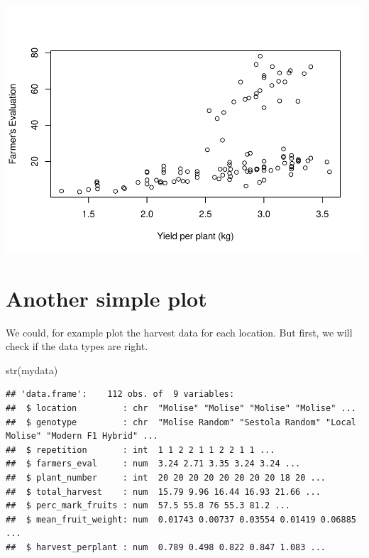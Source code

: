 \documentclass[
]{book}
\newenvironment{Shaded}{\begin{snugshade}}{\end{snugshade}}
\newcommand{\AttributeTok}[1]{\textcolor[rgb]{0.77,0.63,0.00}{#1}}
\newcommand{\CommentTok}[1]{\textcolor[rgb]{0.56,0.35,0.01}{\textit{#1}}}
\newcommand{\FunctionTok}[1]{\textcolor[rgb]{0.00,0.00,0.00}{#1}}
\newcommand{\NormalTok}[1]{#1}
\newcommand{\SpecialCharTok}[1]{\textcolor[rgb]{0.00,0.00,0.00}{#1}}
\newcommand{\StringTok}[1]{\textcolor[rgb]{0.31,0.60,0.02}{#1}}
\begin{document}
\begin{Shaded}
\end{Shaded}

\includegraphics{PPB-Toolkit_files/figure-latex/unnamed-chunk-33-1.pdf}

\hypertarget{another-simple-plot}{%
\section{Another simple plot}\label{another-simple-plot}}

We could, for example plot the harvest data for each location. But first, we will check if the data types are right.

\begin{Shaded}
\begin{Highlighting}[]
\FunctionTok{str}\NormalTok{(mydata)}
\end{Highlighting}
\end{Shaded}

\begin{verbatim}
## 'data.frame':    112 obs. of  9 variables:
##  $ location         : chr  "Molise" "Molise" "Molise" "Molise" ...
##  $ genotype         : chr  "Molise Random" "Sestola Random" "Local Molise" "Modern F1 Hybrid" ...
##  $ repetition       : int  1 1 2 2 1 1 2 2 1 1 ...
##  $ farmers_eval     : num  3.24 2.71 3.35 3.24 3.24 ...
##  $ plant_number     : int  20 20 20 20 20 20 20 20 18 20 ...
##  $ total_harvest    : num  15.79 9.96 16.44 16.93 21.66 ...
##  $ perc_mark_fruits : num  57.5 55.8 76 55.3 81.2 ...
##  $ mean_fruit_weight: num  0.01743 0.00737 0.03554 0.01419 0.06885 ...
##  $ harvest_perplant : num  0.789 0.498 0.822 0.847 1.083 ...
\end{verbatim}
\end{document}
